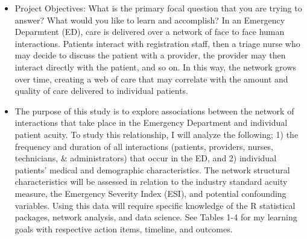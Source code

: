 \documentclass[]{elsarticle} %
\providecommand{\tightlist}{%
  \setlength{\itemsep}{0pt}\setlength{\parskip}{0pt}}
\begin{document}
\begin{itemize}
\tightlist
\item
  Project Objectives: What is the primary focal question that you are
  trying to answer? What would you like to learn and accomplish? In an
  Emergency Deparmtent (ED), care is delivered over a network of face to
  face human interactions. Patients interact with registration staff,
  then a triage nurse who may decide to discuss the patient with a
  provider, the provider may then interact directly with the patient,
  and so on. In this way, the network grows over time, creating a web of
  care that may correlate with the amount and quality of care delivered
  to individual patients.
\item
  The purpose of this study is to explore associations between the
  network of interactions that take place in the Emergency Department
  and individual patient acuity. To study this relationship, I will
  analyze the following; 1) the frequency and duration of all
  interactions (patients, providers, nurses, technicians, \&
  administrators) that occur in the ED, and 2) individual patients'
  medical and demographic characteristics. The network structural
  characteristics will be assessed in relation to the industry standard
  acuity measure, the Emergency Severity Index (ESI), and potential
  confounding variables. Using this data will require specific knowledge
  of the R statistical packages, network analysis, and data science. See
  Tables 1-4 for my learning goals with respective action items,
  timeline, and outcomes.
\end{itemize}
\end{document}
